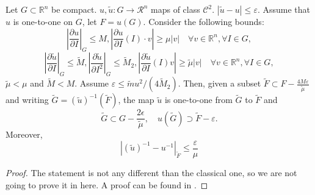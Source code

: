 \begin{lemma}\label{lemma:2.3}
Let $G \subset \mathbb{R}^n$ be compact. $u,\tilde u: G \rightarrow \mathcal{R}^n$ maps of class $\mathcal{C}^2$. $|\tilde u - u|\leq \varepsilon$. Assume that $u$ is one-to-one on $G$, let $F = u(G)$. Consider the following bounds:
$$\left|\frac{\partial u}{\partial I}\right|_G \leq M, \left|\frac{\partial u}{\partial I}(I)\cdot v\right| \geq \mu|v| \quad \forall v\in\mathbb{R}^n, \forall I \in G,$$
$$\left|\frac{\partial \tilde u }{\partial I}\right|_G\leq\tilde M, \left|\frac{\partial \tilde u}{\partial I^2}\right|_G\leq\tilde M_2, \left|\frac{\partial \tilde u}{\partial I}(I) v\right|\geq\tilde\mu|v| \quad \forall v \in \mathbb{R}^n, \forall I \in G,$$
$\tilde \mu < \mu$ and $\tilde M < M$. Assume $\varepsilon \leq \tilde mu^2/(4\tilde M_2)$.
Then, given a subset $\tilde F \subset F - \frac{4M\varepsilon}{\tilde \mu}$ and writing $\tilde G = (\tilde u)^{-1}(\tilde F)$, the map $\tilde u$ is one-to-one from $\tilde G$ to $\tilde F$ and
$$ \tilde G \subset G - \frac{2\epsilon}{\tilde \mu}, \quad u(\tilde G) \supset \tilde F - \varepsilon.$$
Moreover,
$$|(\tilde u)^{-1} - u^{-1}|_{\tilde F} \leq \frac{\varepsilon}{\mu}$$
\end{lemma}

\begin{proof}
The statement is not any different than the classical one, so we are not going to prove it in here. A proof can be found in \cite{D}.
\end{proof}


